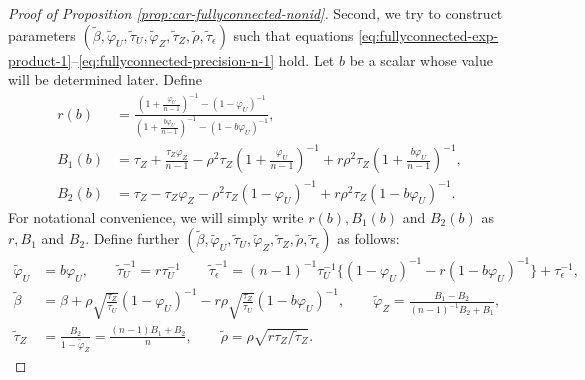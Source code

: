 \documentclass[11pt]{article}
\theoremstyle{definition}
\theoremstyle{remark}
\begin{document}
\begin{proof}[Proof of Proposition \ref{prop:car-fullyconnected-nonid}]
Second, we try to construct parameters $(\tilde\beta, \tilde\varphi_U, \tilde\tau_U, \tilde\varphi_Z, \tilde\tau_Z, \tilde\rho, \tilde\tau_\epsilon)$ such that equations \eqref{eq:fullyconnected-exp-product-1}--\eqref{eq:fullyconnected-precision-n-1} hold. 
Let $b$ be a scalar whose value will be determined later. Define 
\begin{align}
r(b) &= \frac{\left(1 + \frac{\varphi_U}{n-1} \right)^{-1} - \left(1-\varphi_U\right)^{-1}}{\left(1 + \frac{b\varphi_U}{n-1} \right)^{-1} - \left(1-b\varphi_U\right)^{-1}} 
,
\label{eq:car-full-r}
\\
\nonumber
B_1(b) & = \tau_Z + \frac{\tau_Z\varphi_Z}{n-1} - \rho^2\tau_Z\left( 1 + \frac{\varphi_U}{n-1}\right)^{-1} + r\rho^2 \tau_Z \left( 1 + \frac{b\varphi_U}{n-1}\right)^{-1},
\\
\nonumber
B_2(b) & = \tau_Z - \tau_Z \varphi_Z - \rho^2\tau_Z(1-\varphi_U)^{-1} + r\rho^2\tau_Z(1-b\varphi_U)^{-1}.
\end{align}
For notational convenience, we will simply write $r(b), B_1(b)$ and $B_2(b)$ as  $r, B_1$ and $B_2$. 
Define further $(\tilde\beta, \tilde\varphi_U, \tilde\tau_U, \tilde\varphi_Z, \tilde\tau_Z, \tilde\rho, \tilde\tau_\epsilon)$ as follows:
\begin{align}\label{eq:tilde_car_non}
    \tilde\varphi_U & = b\varphi_U, 
    \qquad 
    \tilde\tau_U^{-1} = r \tau_U^{-1}
    \qquad 
    \tilde\tau_\epsilon^{-1} = (n-1)^{-1}\tau_U^{-1}\{(1-\varphi_U)^{-1} - r(1-b\varphi_U)^{-1}\} + \tau_\epsilon^{-1}, 
    \nonumber
    \\
    \tilde\beta & = \beta + \rho\sqrt{\frac{\tau_Z}{\tau_U}}(1-\varphi_U)^{-1} - r\rho\sqrt{\frac{\tau_Z}{\tau_U}}(1-b\varphi_U)^{-1}, 
    \qquad 
    \tilde\varphi_Z = \frac{B_1 - B_2}{(n-1)^{-1}B_2 + B_1},
    \nonumber
    \\
    \tilde\tau_Z &= 
    \frac{B_2}{1-\tilde\varphi_Z}
    = 
    \frac{(n-1)B_1 + B_2}{n}, \qquad \tilde\rho = \rho\sqrt{r \tau_Z/\tilde\tau_Z}. 
\end{align}


\end{proof}
\end{document}

